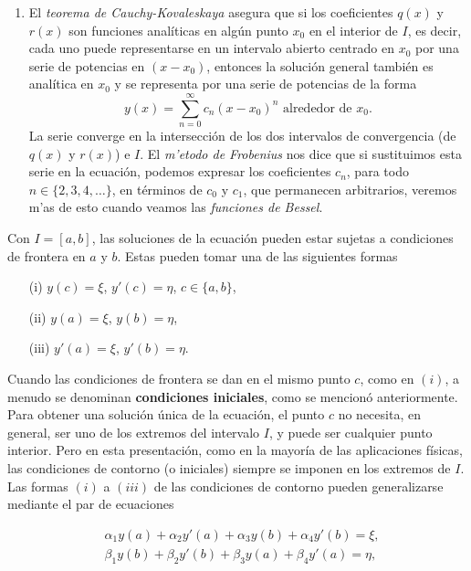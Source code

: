 \documentclass[main.tex]{subfiles}
\begin{document}
\begin{enumerate}
    \item El \emph{teorema de Cauchy-Kovaleskaya} asegura que si los coeficientes \(q(x)\) y \(r(x)\) son funciones analíticas en algún punto \(x_0\) en el interior de \(I\), es decir, cada uno puede representarse en un intervalo abierto centrado en \(x_0\) por una serie de potencias en \((x-x_0)\), entonces la solución general también es analítica en \(x_0\) y se representa por una serie de potencias de la forma
    \[
    y(x)=\sum_{n=0}^\infty c_n (x - x_0)^n\text{ alrededor de }x_{0}.
    \]
    La serie converge en la intersección de los dos intervalos de convergencia (de \(q(x)\) y \(r(x)\)) e \(I\). El \emph{m'etodo de Frobenius} nos dice que si sustituimos esta serie en la ecuación, podemos expresar los coeficientes \(c_n\), para todo \(n\in\{2, 3, 4,\dots\}\), en términos de \(c_0\) y \(c_1\), que permanecen arbitrarios, veremos m'as de esto cuando veamos las \emph{funciones de Bessel}.
\end{enumerate}

Con \(I=[a,b]\), las soluciones de la ecuación pueden estar sujetas a condiciones de frontera en \(a\) y \(b\). Estas pueden tomar una de las siguientes formas

\begin{enumerate}
    \item[(i)] \(y(c)=\xi\), \(y'(c)=\eta\), \(c\in\{a,b\}\),
    \item[(ii)] \(y(a)=\xi\), \(y(b)=\eta\),
    \item[(iii)] \(y'(a)=\xi\), \(y'(b)=\eta\).
\end{enumerate}

Cuando las condiciones de frontera se dan en el mismo punto \(c\), como en \((i)\), a menudo se denominan \textbf{condiciones iniciales}, como se mencionó anteriormente. Para obtener una solución única de la ecuación, el punto \(c\) no necesita, en general, ser uno de los extremos del intervalo \(I\), y puede ser cualquier punto interior. Pero en esta presentación, como en la mayoría de las aplicaciones físicas, las condiciones de contorno (o iniciales) siempre se imponen en los extremos de \(I\). Las formas \((i)\) a \((iii)\) de las condiciones de contorno pueden generalizarse mediante el par de ecuaciones

\begin{align*}
&\alpha_1 y(a)+\alpha_2 y'(a)+\alpha_3y(b)+\alpha_4y'(b)=\xi,\\
&\beta_1 y(b)+\beta_2y'(b)+\beta_3y(a)+\beta_4y'(a)=\eta,
\end{align*}
\end{document}
